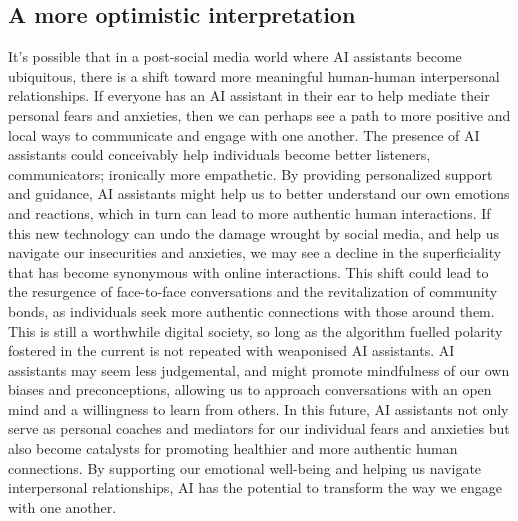 \subsection{A more optimistic interpretation}
It's possible that in a post-social media world where AI assistants become ubiquitous, there is a shift toward more meaningful human-human interpersonal relationships. If everyone has an AI assistant in their ear to help mediate their personal fears and anxieties, then we can perhaps see a path to more positive and local ways to communicate and engage with one another. The presence of AI assistants could conceivably help individuals become better listeners, communicators; ironically more empathetic. By providing personalized support and guidance, AI assistants might help us to better understand our own emotions and reactions, which in turn can lead to more authentic human interactions. If this new technology can undo the damage wrought by social media, and help us navigate our insecurities and anxieties, we may see a decline in the superficiality that has become synonymous with online interactions. This shift could lead to the resurgence of face-to-face conversations and the revitalization of community bonds, as individuals seek more authentic connections with those around them. This is still a worthwhile digital society, so long as the algorithm fuelled polarity fostered in the current is not repeated with weaponised AI assistants. AI assistants may seem less judgemental, and might promote mindfulness of our own biases and preconceptions, allowing us to approach conversations with an open mind and a willingness to learn from others. In this future, AI assistants not only serve as personal coaches and mediators for our individual fears and anxieties but also become catalysts for promoting healthier and more authentic human connections. By supporting our emotional well-being and helping us navigate interpersonal relationships, AI has the potential to transform the way we engage with one another. 
\newpage

